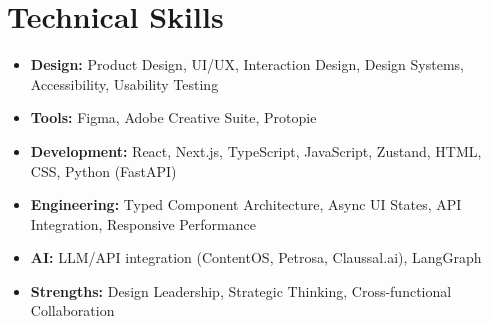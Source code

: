 \documentclass[a4paper,10pt]{article}
\begin{document}
\section{Technical Skills}
\begin{itemize}[noitemsep, topsep=0pt, leftmargin=1.5em]
    \item \textbf{Design:} Product Design, UI/UX, Interaction Design, Design Systems, Accessibility, Usability Testing
    \item \textbf{Tools:} Figma, Adobe Creative Suite, Protopie
    \item \textbf{Development:} React, Next.js, TypeScript, JavaScript, Zustand, HTML, CSS, Python (FastAPI)
    \item \textbf{Engineering:} Typed Component Architecture, Async UI States, API Integration, Responsive Performance
    \item \textbf{AI:} LLM/API integration (ContentOS, Petrosa, Claussal.ai), LangGraph
    \item \textbf{Strengths:} Design Leadership, Strategic Thinking, Cross-functional Collaboration
\end{itemize}
\end{document}
